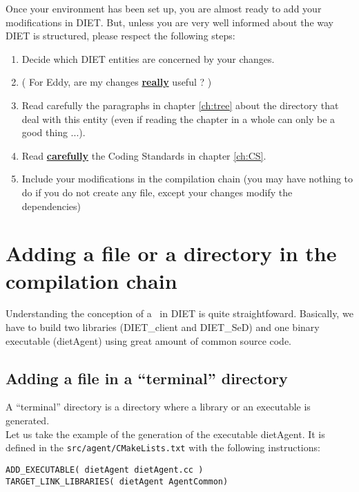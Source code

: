 Once your environment has been set up, you are almost ready to add
your modifications in DIET. But, unless you are very well informed
about the way DIET is structured, please respect the following steps:
\begin{enumerate}
\item Decide which DIET entities are concerned by your changes.
\item ( For Eddy, are my changes \underline{\textbf{really}} useful ? )
\item Read carefully the paragraphs in chapter \ref{ch:tree} about the
  directory that deal with this entity (even if reading the chapter in
  a whole can only be a good thing ...).
\item Read \underline{\textbf{carefully}} the Coding Standards in
  chapter \ref{ch:CS}.
\item Include your modifications in the compilation chain (you may
  have nothing to do if you do not create any file, except your
  changes modify the dependencies)
\end{enumerate}


\section{Adding a file or a directory in the compilation chain}


Understanding the conception of a \CMakeLists\ in DIET is quite
straightfoward.
Basically, we have to build two libraries (\textsf{DIET\_client}
and \textsf{DIET\_SeD}) and one binary executable (\textsf{dietAgent})
using great amount of common source code.

\subsection{Adding a file in a ``terminal'' directory}

A ``terminal'' directory is a directory where a library or an
executable is generated.\\

Let us take the example of the generation of the executable
\textsf{dietAgent}.
It is defined in the \texttt{src/agent/CMakeLists.txt}
with the following \cmake instructions:
\begin{verbatim}
ADD_EXECUTABLE( dietAgent dietAgent.cc )
TARGET_LINK_LIBRARIES( dietAgent AgentCommon)
\end{verbatim}

